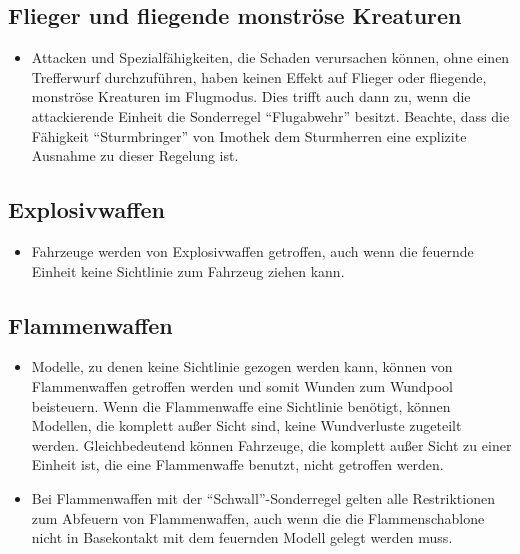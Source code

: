 \subsection{Flieger und fliegende monströse Kreaturen}

\begin{itemize}

 \item Attacken und Spezialfähigkeiten, die Schaden verursachen können, ohne
  einen Trefferwurf durchzuführen, haben keinen Effekt auf Flieger oder
  fliegende, monströse Kreaturen im Flugmodus.
Dies trifft auch dann zu, wenn die attackierende Einheit die Sonderregel
``Flugabwehr'' besitzt. Beachte, dass die Fähigkeit ``Sturmbringer'' von Imothek dem
Sturmherren eine explizite Ausnahme zu dieser Regelung ist.

\end{itemize}

\subsection{Explosivwaffen}

\begin{itemize}

 \item Fahrzeuge werden von Explosivwaffen getroffen, auch wenn die feuernde
  Einheit keine Sichtlinie zum Fahrzeug ziehen kann.

\end{itemize}

\subsection{Flammenwaffen}

\begin{itemize}

 \item Modelle, zu denen keine Sichtlinie gezogen werden kann, können von
  Flammenwaffen getroffen werden und somit Wunden zum Wundpool beisteuern. Wenn
  die Flammenwaffe eine Sichtlinie benötigt, können Modellen, die komplett außer
  Sicht sind, keine Wundverluste zugeteilt werden.
Gleichbedeutend können Fahrzeuge, die komplett außer Sicht zu einer Einheit ist,
die eine Flammenwaffe benutzt, nicht getroffen werden.

\item Bei Flammenwaffen mit der ``Schwall''-Sonderregel gelten alle Restriktionen
 zum Abfeuern von Flammenwaffen, auch wenn die die Flammenschablone nicht in
 Basekontakt mit dem feuernden Modell gelegt werden muss.

\end{itemize}

